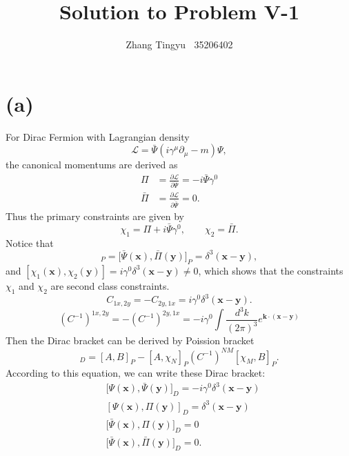 \documentclass[12pt]{article}
\title{Solution to Problem V-1}
\author{Zhang Tingyu $\ $ 35206402}
\begin{document}
\maketitle

\section*{(a)}

For Dirac Fermion with Lagrangian density
\begin{equation}
    \mathcal{L}=\bar{\Psi}(i\gamma^\mu\partial_\mu-m)\Psi,
\end{equation}
the canonical momentums are derived as 
\begin{equation}
    \begin{split}
        \Pi&=\frac{\partial\mathcal{L}}{\partial\dot{\Psi}}=-i\bar{\Psi}\gamma^0\\
        \bar{\Pi}&=\frac{\partial\mathcal{L}}{\partial\dot{\bar{\Psi}}}=0.
    \end{split}
\end{equation} 
Thus the primary constraints are given by
\begin{equation}
    \chi_1=\Pi+i\bar{\Psi}\gamma^0,\qquad\chi_2=\bar{\Pi}.
\end{equation}
Notice that 
\begin{equation}
    [\Psi(\mathbf{x}),\Pi(\mathbf{y})]_P=\big[\bar{\Psi}(\mathbf{x}),
    \bar{\Pi}(\mathbf{y})\big]_P=\delta^3(\mathbf{x}-\mathbf{y}),
\end{equation}
and $[\chi_1(\mathbf{x}),\chi_2(\mathbf{y})]=
i\gamma^0\delta^3(\mathbf{x}-\mathbf{y})\neq0$, which shows that the constraints 
$\chi_1$ and $\chi_2$ are second class constraints.
\begin{equation}
    C_{1x,2y}=-C_{2y,1x}=i\gamma^0\delta^3(\mathbf{x}-\mathbf{y}).
\end{equation}
\begin{equation}
    (C^{-1})^{1x,2y}=-(C^{-1})^{2y,1x}=-i\gamma^0\int\frac{d^3k}{(2\pi)^3}e^{\mathbf{k}
    \cdot(\mathbf{x}-\mathbf{y})}
\end{equation}
Then the Dirac bracket can be derived by Poission bracket 
\begin{equation}
    [A, B]_{D}=[A, B]_{P}-\left[A, \chi_{N}\right]_{P}
    \left(C^{-1}\right)^{N M}\left[\chi_{M}, B\right]_{P}.
\end{equation}
According to this equation, we can write these Dirac bracket:
\begin{equation}
    \begin{split}
        &\big[\Psi(\mathbf{x}),\bar{\Psi}(\mathbf{y})\big]_D=-i\gamma^0\delta^3
        (\mathbf{x}-\mathbf{y})\\
        &[\Psi(\mathbf{x}),\Pi(\mathbf{y})]_D=\delta^3(\mathbf{x}-\mathbf{y})\\
        &\big[\bar{\Psi}(\mathbf{x}),\Pi(\mathbf{y})\big]_D=0\\
        &\big[\bar{\Psi}(\mathbf{x}),\bar{\Pi}(\mathbf{y})\big]_D=0.
    \end{split}
\end{equation}
\end{document}
